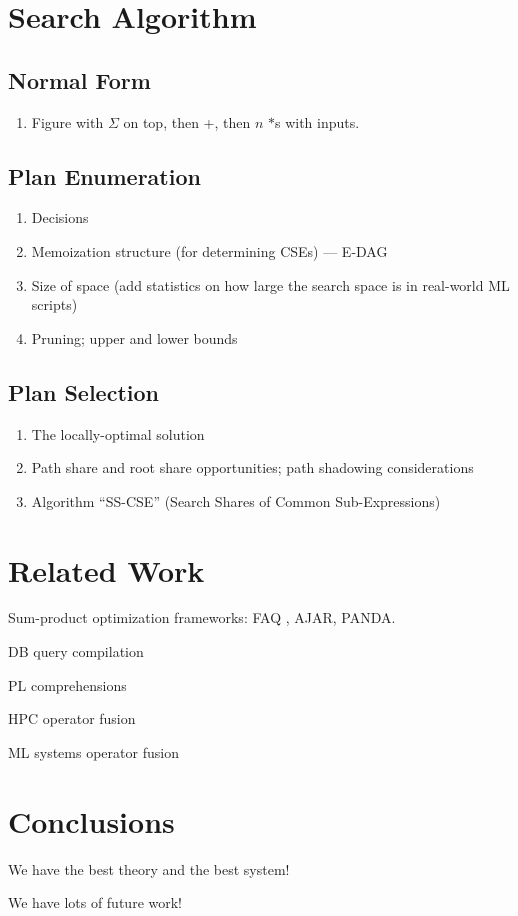 \documentclass{vldb}
\begin{document}
\section{Search Algorithm}

\subsection{Normal Form}
\begin{enumerate}
\item Figure with $\Sigma$ on top, then +, then $n$ $*$s with inputs.
\end{enumerate}

\subsection{Plan Enumeration}
\begin{enumerate}
\item Decisions
\item Memoization structure (for determining CSEs) --- E-DAG
\item Size of space (add statistics on how large the search space is in real-world ML scripts)
\item Pruning; upper and lower bounds
\end{enumerate}

\subsection{Plan Selection}
\begin{enumerate}
\item The locally-optimal solution
\item Path share and root share opportunities; path shadowing considerations
\item Algorithm ``SS-CSE'' (Search Shares of Common Sub-Expressions)
\end{enumerate}


\section{Related Work}
\label{sec:rwork}

Sum-product optimization frameworks: FAQ \cite{KhamisNR16}, AJAR, PANDA.

DB query compilation

PL comprehensions

HPC operator fusion

ML systems operator fusion

\section{Conclusions}

We have the best theory and the best system!

We have lots of future work!

\small

  
\normalsize
\end{document}
